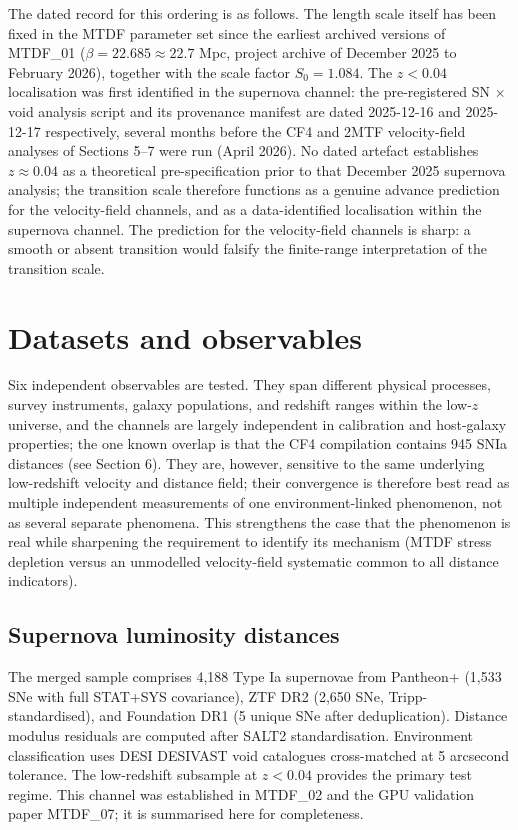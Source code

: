 \documentclass[11pt,a4paper]{article}
\begin{document}
The dated record for this ordering is as follows. The length scale itself has been fixed in the MTDF parameter set since the earliest archived versions of MTDF\_\allowbreak{}01 (\(\beta = 22.685 \approx 22.7\) Mpc, project archive of December 2025 to February 2026), together with the scale factor \(S_0 = 1.084\). The \(z < 0.04\) localisation was first identified in the supernova channel: the pre-registered SN $\times$ void analysis script and its provenance manifest are dated 2025-12-16 and 2025-12-17 respectively, several months before the CF4 and 2MTF velocity-field analyses of Sections 5--7 were run (April 2026). No dated artefact establishes \(z \approx 0.04\) as a theoretical pre-specification prior to that December 2025 supernova analysis; the transition scale therefore functions as a genuine advance prediction for the velocity-field channels, and as a data-identified localisation within the supernova channel. The prediction for the velocity-field channels is sharp: a smooth or absent transition would falsify the finite-range interpretation of the transition scale.

\section{Datasets and observables}
\label{sec:sec3}
Six independent observables are tested. They span different physical processes, survey instruments, galaxy populations, and redshift ranges within the low-\(z\) universe, and the channels are largely independent in calibration and host-galaxy properties; the one known overlap is that the CF4 compilation contains 945 SNIa distances (see Section 6). They are, however, sensitive to the same underlying low-redshift velocity and distance field; their convergence is therefore best read as multiple independent measurements of one environment-linked phenomenon, not as several separate phenomena. This strengthens the case that the phenomenon is real while sharpening the requirement to identify its mechanism (MTDF stress depletion versus an unmodelled velocity-field systematic common to all distance indicators).

\subsection{Supernova luminosity distances}
The merged sample comprises 4,188 Type Ia supernovae from Pantheon+ (1,533 SNe with full STAT+SYS covariance), ZTF DR2 (2,650 SNe, Tripp-standardised), and Foundation DR1 (5 unique SNe after deduplication). Distance modulus residuals are computed after SALT2 standardisation. Environment classification uses DESI DESIVAST void catalogues cross-matched at 5 arcsecond tolerance. The low-redshift subsample at \(z < 0.04\) provides the primary test regime. This channel was established in MTDF\_\allowbreak{}02 and the GPU validation paper MTDF\_\allowbreak{}07; it is summarised here for completeness.
\end{document}
